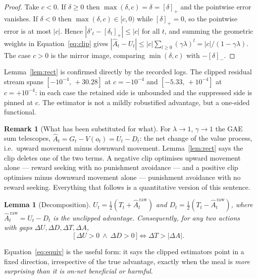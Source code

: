 \documentclass[11pt]{article}
\newtheorem{lemma}[theorem]{Lemma}
\theoremstyle{definition}
\newtheorem{remark}[theorem]{Remark}
\newcommand{\Ahat}{\hat A}
\newcommand{\up}[1]{\left[#1\right]_{+}}
\newcommand{\dn}[1]{\left[#1\right]_{-}}
\begin{document}
\begin{proof}
Take $c<0$. If $\delta\ge0$ then $\max(\delta,c)=\delta=\up{\delta}$ and the
pointwise error vanishes. If $\delta<0$ then $\max(\delta,c)\in[c,0)$ while
$\up{\delta}=0$, so the pointwise error is at most $|c|$. Hence
$|\delta'_t-\up{\delta_t}|\le|c|$ for all $t$, and summing the geometric
weights in Equation~\eqref{eq:clip} gives
$|\Ahat_t-U_t|\le|c|\sum_{l\ge0}(\gamma\lambda)^l=|c|/(1-\gamma\lambda)$. The
case $c>0$ is the mirror image, comparing $\min(\delta,c)$ with $-\dn{\delta}$.
\end{proof}

\noindent
Lemma~\ref{lem:rect} is confirmed directly by the recorded logs. The clipped
residual stream spans $[-10^{-4},\,+30.28]$ at $c=-10^{-4}$ and
$[-5.33,\,+10^{-4}]$ at $c=+10^{-4}$: in each case the retained side is
unbounded and the suppressed side is pinned at $c$. The estimator is not a
mildly robustified advantage, but a one-sided functional.

\begin{remark}[What has been substituted for what]
\label{rem:objective}
For $\lambda\to1$, $\gamma\to1$ the GAE sum telescopes,
$\Ahat_t=G_t-V(o_t)=U_t-D_t$: the net change of the value process, i.e.\
upward movement minus downward movement. Lemma~\ref{lem:rect} says the clip
deletes one of the two terms. A negative clip optimises upward movement alone
--- reward seeking with no punishment avoidance --- and a positive clip
optimises minus downward movement alone --- punishment avoidance with no
reward seeking. Everything that follows is a quantitative version of this
sentence.
\end{remark}

\begin{lemma}[Decomposition]
\label{lem:decomp}
$U_t=\tfrac12(T_t+\Ahat^{\,\mathrm{raw}}_t)$ and
$D_t=\tfrac12(T_t-\Ahat^{\,\mathrm{raw}}_t)$, where
$\Ahat^{\,\mathrm{raw}}_t=U_t-D_t$ is the unclipped advantage. Consequently,
for any two actions with gaps $\Delta U,\Delta D,\Delta T,\Delta A$,
\begin{equation}
\big[\,\Delta U>0\ \wedge\ \Delta D>0\,\big]
\iff
\Delta T>|\Delta A| .
\label{eq:equiv}
\end{equation}
\end{lemma}

\noindent
Equation~\eqref{eq:equiv} is the useful form: it says the clipped estimators
point in a fixed direction, irrespective of the true advantage, exactly when
the meal is \emph{more surprising than it is on-net beneficial or harmful}.
\end{document}
